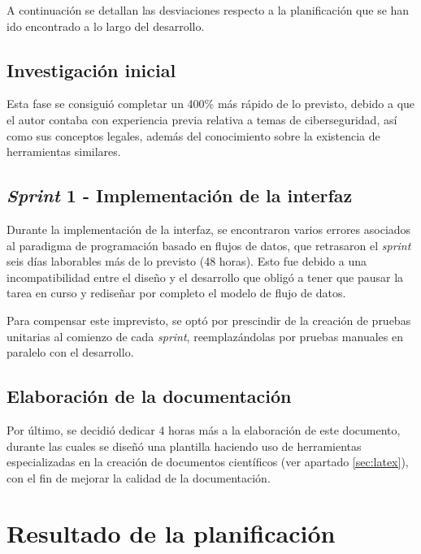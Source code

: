 A continuación se detallan las desviaciones respecto a la planificación que se han ido encontrado a lo largo del desarrollo.\sn

\subsection{Investigación inicial} \label{sub:varinvestigation}

Esta fase se consiguió completar un 400\% más rápido de lo previsto, debido a que el autor contaba con experiencia previa relativa a temas de ciberseguridad, así como sus conceptos legales, además del conocimiento sobre la existencia de herramientas similares.\n

\subsection{\textit{Sprint} 1 - Implementación de la interfaz} \label{sub:varsprint1}

Durante la implementación de la interfaz, se encontraron varios errores asociados al paradigma de programación basado en flujos de datos, que retrasaron el \textit{sprint} seis días laborables más de lo previsto (48 horas). Esto fue debido a una incompatibilidad entre el diseño y el desarrollo que obligó a tener que pausar la tarea en curso y rediseñar por completo el modelo de flujo de datos.\sn

Para compensar este imprevisto, se optó por prescindir de la creación de pruebas unitarias al comienzo de cada \textit{sprint}, reemplazándolas por pruebas manuales en paralelo con el desarrollo.\n

\subsection{Elaboración de la documentación} \label{sub:vardoc}

Por último, se decidió dedicar 4 horas más a la elaboración de este documento, durante las cuales se diseñó una plantilla haciendo uso de herramientas especializadas en la creación de documentos científicos (ver apartado \ref{sec:latex}), con el fin de mejorar la calidad de la documentación.\n


\section{Resultado de la planificación} \label{sec:resultplan}

